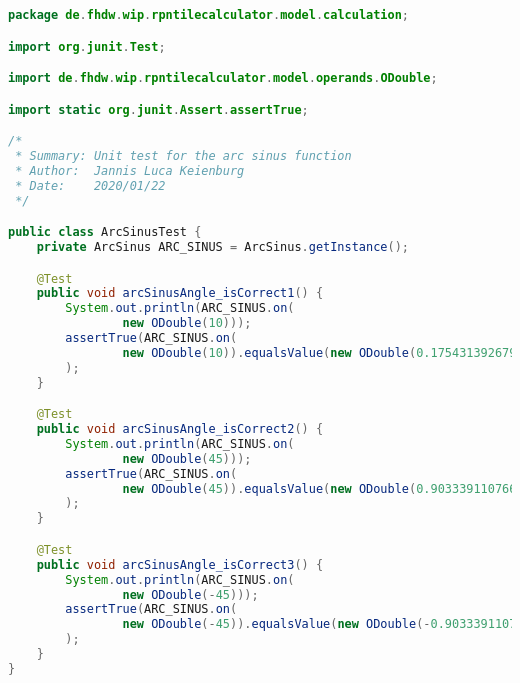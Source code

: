 \begin{lstlisting}[caption=ArcSinusTest (Keienburg),label=list:ArcSinusTest,language=Java]
package de.fhdw.wip.rpntilecalculator.model.calculation;

import org.junit.Test;

import de.fhdw.wip.rpntilecalculator.model.operands.ODouble;

import static org.junit.Assert.assertTrue;

/*
 * Summary: Unit test for the arc sinus function
 * Author:  Jannis Luca Keienburg
 * Date:    2020/01/22
 */

public class ArcSinusTest {
    private ArcSinus ARC_SINUS = ArcSinus.getInstance();

    @Test
    public void arcSinusAngle_isCorrect1() {
        System.out.println(ARC_SINUS.on(
                new ODouble(10)));
        assertTrue(ARC_SINUS.on(
                new ODouble(10)).equalsValue(new ODouble(0.17543139267904395))
        );
    }

    @Test
    public void arcSinusAngle_isCorrect2() {
        System.out.println(ARC_SINUS.on(
                new ODouble(45)));
        assertTrue(ARC_SINUS.on(
                new ODouble(45)).equalsValue(new ODouble(0.9033391107665127))
        );
    }

    @Test
    public void arcSinusAngle_isCorrect3() {
        System.out.println(ARC_SINUS.on(
                new ODouble(-45)));
        assertTrue(ARC_SINUS.on(
                new ODouble(-45)).equalsValue(new ODouble(-0.9033391107665127))
        );
    }
}
\end{lstlisting} 

